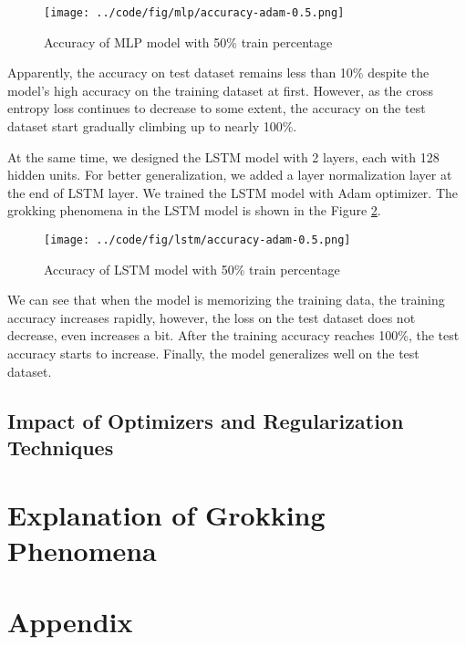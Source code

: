 \documentclass{article}
\begin{document}
\begin{figure}[ht]
    \centering
    \texttt{[image: ../code/fig/mlp/accuracy-adam-0.5.png]}
    \caption{Accuracy of MLP model with 50\% train percentage}
    \label{fig:mlp-accuracy}
\end{figure}

Apparently, the accuracy on test dataset remains less than 10\% despite the model's high accuracy on the training dataset at first. However, as the cross entropy loss continues to decrease to some extent, the accuracy on the test dataset start gradually climbing up to nearly 100\%.

At the same time, we designed the LSTM model with 2 layers, each with 128 hidden units. For better generalization, we added a layer normalization layer at the end of LSTM layer. We trained the LSTM model with Adam optimizer. The grokking phenomena in the LSTM model is shown in the Figure \ref{fig:lstm-accuracy}.

\begin{figure}[ht]
    \centering
    \texttt{[image: ../code/fig/lstm/accuracy-adam-0.5.png]}
    \caption{Accuracy of LSTM model with 50\% train percentage}
    \label{fig:lstm-accuracy}
\end{figure}
We can see that when the model is memorizing the training data, the training accuracy increases rapidly, however, the loss on the test dataset does not decrease, even increases a bit. After the training accuracy reaches 100\%, the test accuracy starts to increase. Finally, the model generalizes well on the test dataset.

\subsection{Impact of Optimizers and Regularization Techniques}

\section{Explanation of Grokking Phenomena}

\appendix

\section{Appendix}
\end{document}
